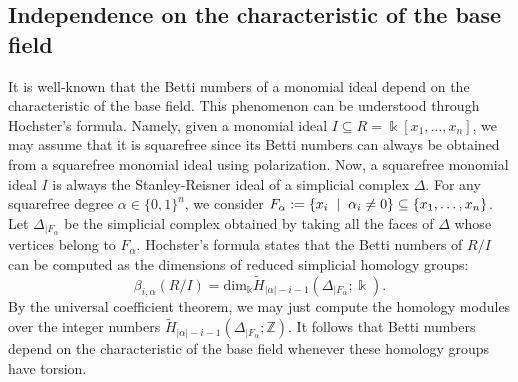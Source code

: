 \documentclass[12pt]{amsart}
\theoremstyle{definition}
\theoremstyle{remark}
\numberwithin{equation}{section}
\newcommand{\bZ}{{\mathbb{Z}}}
\newcommand{\dm}{\mathrm {dim }}
\newcommand\kk{\Bbbk}
\newcommand{\phil}[1]{{\color{red} \sf $\star\star$ Philippe: [#1]}}
\begin{document}
\vskip 2mm



\subsection{Independence on the characteristic of the base field}
It is well-known that the Betti numbers of a monomial ideal depend on the characteristic of the base field.
This phenomenon can be understood through Hochster's formula.
Namely, given  a monomial ideal $I\subseteq R=\kk[x_1,\dots,x_n]$,
we may assume that it is squarefree since its Betti numbers can always be obtained from a squarefree monomial ideal using polarization.
Now, a squarefree monomial ideal $I$ is always the Stanley-Reisner ideal of a simplicial complex $\Delta$.
For any squarefree degree $\alpha \in \{0,1\}^n$, we consider
$F_\alpha:=\{x_i \hskip 2mm | \hskip 2mm \alpha_i \neq 0 \} \subseteq \{x_1,\dots,x_n\}$.
Let $\Delta_{|F_\alpha}$ be the simplicial complex obtained by taking all the faces of $\Delta$
whose vertices belong to $F_\alpha$. Hochster's formula states that the Betti numbers of $R/I$ can be computed
as the dimensions of reduced simplicial homology groups:
$$\beta_{i,\alpha}(R/I)=\dm_{\kk} \widetilde{H}_{|\alpha|-i-1}(\Delta_{|F_\alpha}; \kk).$$
By the universal coefficient theorem, we may just compute the homology modules
over the integer numbers $\widetilde{H}_{|\alpha|-i-1}(\Delta_{|F_\alpha}; \bZ)$. It follows that Betti
numbers depend on the characteristic of the base field whenever these homology groups have torsion.

\vskip 2mm
\end{document}
